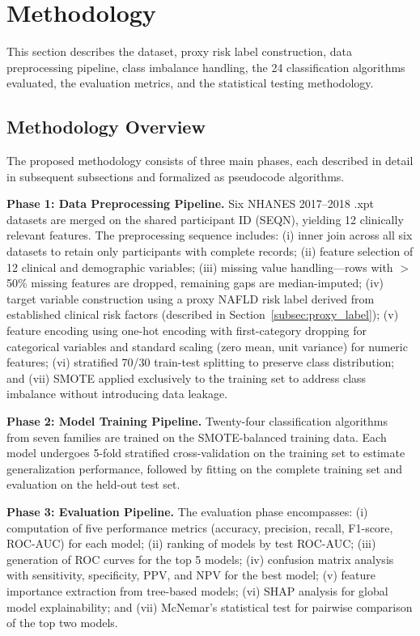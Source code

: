 \documentclass[conference,10pt]{IEEEtran}
\begin{document}
\section{Methodology}
\label{sec:methodology}

This section describes the dataset, proxy risk label construction, data preprocessing pipeline, class imbalance handling, the 24 classification algorithms evaluated, the evaluation metrics, and the statistical testing methodology.

\subsection{Methodology Overview}
\label{subsec:methodology_overview}

The proposed methodology consists of three main phases, each described in detail in subsequent subsections and formalized as pseudocode algorithms.

\textbf{Phase 1: Data Preprocessing Pipeline.}
Six NHANES 2017--2018 .xpt datasets are merged on the shared participant ID (SEQN), yielding 12 clinically relevant features. The preprocessing sequence includes: (i) inner join across all six datasets to retain only participants with complete records; (ii) feature selection of 12 clinical and demographic variables; (iii) missing value handling---rows with $>$50\% missing features are dropped, remaining gaps are median-imputed; (iv) target variable construction using a proxy NAFLD risk label derived from established clinical risk factors (described in Section~\ref{subsec:proxy_label}); (v) feature encoding using one-hot encoding with first-category dropping for categorical variables and standard scaling (zero mean, unit variance) for numeric features; (vi) stratified 70/30 train-test splitting to preserve class distribution; and (vii) SMOTE applied exclusively to the training set to address class imbalance without introducing data leakage.

\textbf{Phase 2: Model Training Pipeline.}
Twenty-four classification algorithms from seven families are trained on the SMOTE-balanced training data. Each model undergoes 5-fold stratified cross-validation on the training set to estimate generalization performance, followed by fitting on the complete training set and evaluation on the held-out test set.

\textbf{Phase 3: Evaluation Pipeline.}
The evaluation phase encompasses: (i) computation of five performance metrics (accuracy, precision, recall, F1-score, ROC-AUC) for each model; (ii) ranking of models by test ROC-AUC; (iii) generation of ROC curves for the top 5 models; (iv) confusion matrix analysis with sensitivity, specificity, PPV, and NPV for the best model; (v) feature importance extraction from tree-based models; (vi) SHAP analysis for global model explainability; and (vii) McNemar's statistical test for pairwise comparison of the top two models.
\end{document}
